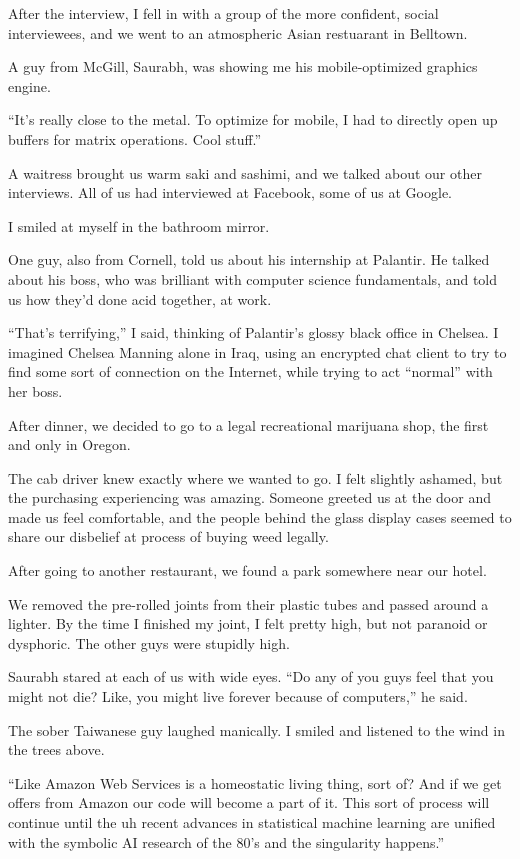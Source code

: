 After the interview, I fell in with a group of the more confident, social
interviewees, and we went to an atmospheric Asian restuarant in Belltown.

A guy from McGill, Saurabh, was showing me his mobile-optimized graphics engine.

``It's really close to the metal.  To optimize for mobile, I had to directly
open up buffers for matrix operations.  Cool stuff.''

A waitress brought us warm saki and sashimi, and we talked about our other
interviews.  All of us had interviewed at Facebook, some of us at Google.  

I smiled at myself in the bathroom mirror.

One guy, also from Cornell, told us about his internship at Palantir.  He talked
about his boss, who was brilliant with computer science fundamentals, and told
us how they'd done acid together, at work. 

``That's terrifying,'' I said, thinking of Palantir's glossy black office in
Chelsea.  I imagined Chelsea Manning alone in Iraq, using an encrypted chat
client to try to find some sort of connection on the Internet, while trying to
act ``normal'' with her boss.

After dinner, we decided to go to a legal recreational marijuana shop, the first
and only in Oregon.

The cab driver knew exactly where we wanted to go.  I felt slightly ashamed, but
the purchasing experiencing was amazing.  Someone greeted us at the door and
made us feel comfortable, and the people behind the glass display cases seemed
to share our disbelief at process of buying weed legally.

After going to another restaurant, we found a park somewhere near our hotel.

We removed the pre-rolled joints from their plastic tubes and passed around a
lighter.  By the time I finished my joint, I felt pretty high, but not paranoid
or dysphoric.  The other guys were stupidly high.

Saurabh stared at each of us with wide eyes.  ``Do any of you guys feel that you
might not die?  Like, you might live forever because of computers,'' he said.

The sober Taiwanese guy laughed manically.  I smiled and listened to the wind in
the trees above.

``Like Amazon Web Services is a homeostatic living thing, sort of?  And if we
get offers from Amazon our code will become a part of it.  This sort of process
will continue until the uh recent advances in statistical machine learning are
unified with the symbolic AI research of the 80's and the singularity happens.''

